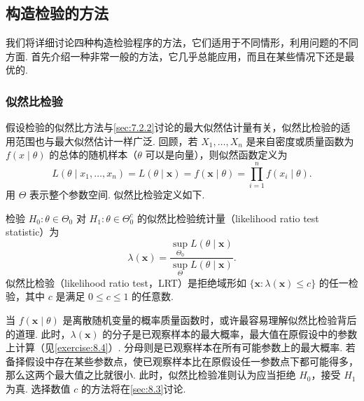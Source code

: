 \subsection{构造检验的方法}\label{sec:8.2}
我们将详细讨论四种构造检验程序的方法，它们适用于不同情形，利用问题的不同方面. 首先介绍一种非常一般的方法，它几乎总能应用，而且在某些情况下还是最优的.
\subsubsection{似然比检验}\label{sec:8.2.1}
假设检验的似然比方法与\autoref{sec:7.2.2}讨论的最大似然估计量有关，似然比检验的适用范围也与最大似然估计一样广泛. 回顾，若 $X_1,\ldots,X_n$ 是来自密度或质量函数为 $f(x\mid\theta)$ 的总体的随机样本（$\theta$ 可以是向量），则似然函数定义为
$$L(\theta\mid x_1,\ldots,x_n)=L(\theta\mid\boldsymbol x)=f(\boldsymbol x\mid\theta)=\prod_{i=1}^n f(x_i\mid\theta).$$
用 $\Theta$ 表示整个参数空间. 似然比检验定义如下.
\begin{definition}\label{def:8.2.1}
检验 $H_0:\theta\in\Theta_0$ 对 $H_1:\theta\in\Theta_0^c$ 的似然比检验统计量（likelihood ratio test statistic）为
$$\lambda(\boldsymbol x)=\frac{\sup_{\Theta_0}L(\theta\mid\boldsymbol x)}{\sup_\Theta L(\theta\mid\boldsymbol x)}.$$
似然比检验（likelihood ratio test，LRT）是拒绝域形如 $\{\boldsymbol x:\lambda(\boldsymbol x)\le c\}$ 的任一检验，其中 $c$ 是满足 $0\le c\le1$ 的任意数.
\end{definition}
当 $f(\boldsymbol x\mid\theta)$ 是离散随机变量的概率质量函数时，或许最容易理解似然比检验背后的道理. 此时，$\lambda(\boldsymbol x)$ 的分子是已观察样本的最大概率，最大值在原假设中的参数上计算（见\autoref{exercise:8.4}\mbox{）.} 分母则是已观察样本在所有可能参数上的最大概率. 若备择假设中存在某些参数点，使已观察样本比在原假设任一参数点下都可能得多，那么这两个最大值之比就很小. 此时，似然比检验准则认为应当拒绝 $H_0$，接受 $H_1$ 为真. 选择数值 $c$ 的方法将在\autoref{sec:8.3}讨论.

